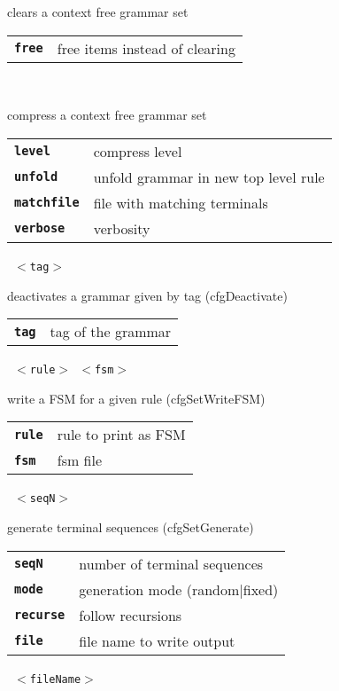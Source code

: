 \begin{description}
\begin{description}
        clears a context free grammar set

      \begin{tabular}{ll}
 \texttt{\textbf{free}} &  free items instead of clearing  \\
      \end{tabular}
       \texttt{    } \

        compress a context free grammar set

      \begin{tabular}{ll}
 \texttt{\textbf{level}} &      compress level  \\
 \texttt{\textbf{unfold}} &     unfold grammar in new top level rule  \\
 \texttt{\textbf{matchfile}} &  file with matching terminals  \\
 \texttt{\textbf{verbose}} &    verbosity  \\
      \end{tabular}
       \texttt{ $<$tag$>$} \

        deactivates a grammar given by tag (cfgDeactivate)

      \begin{tabular}{ll}
 \texttt{\textbf{tag}} &        tag of the grammar  \\
      \end{tabular}
       \texttt{ $<$rule$>$ $<$fsm$>$} \

        write a FSM for a given rule (cfgSetWriteFSM)

      \begin{tabular}{ll}
 \texttt{\textbf{rule}} &       rule to print as FSM  \\
 \texttt{\textbf{fsm}} &        fsm file  \\
      \end{tabular}
       \texttt{ $<$seqN$>$   } \

        generate terminal sequences (cfgSetGenerate)

      \begin{tabular}{ll}
 \texttt{\textbf{seqN}} &       number of terminal sequences  \\
 \texttt{\textbf{mode}} &        generation mode (random|fixed)  \\
 \texttt{\textbf{recurse}} &     follow recursions  \\
 \texttt{\textbf{file}} &        file name to write output  \\
      \end{tabular}
       \texttt{ $<$fileName$>$} \


\end{description}
\end{description}
